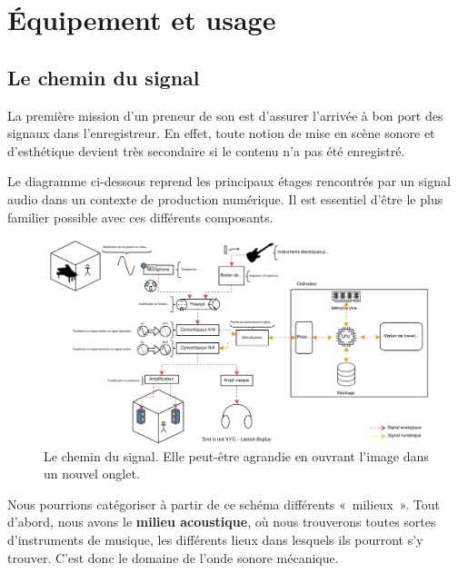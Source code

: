 \documentclass[
]{book}
\begin{document}
\hypertarget{part-uxe9quipement-et-usage}{%
\part{Équipement et usage}\label{part-uxe9quipement-et-usage}}

\hypertarget{le-chemin-du-signal}{%
\chapter{Le chemin du signal}\label{le-chemin-du-signal}}

La première mission d'un preneur de son est d'assurer l'arrivée à bon port des signaux dans l'enregistreur. En effet, toute notion de mise en scène sonore et d'esthétique devient très secondaire si le contenu n'a pas été enregistré.

Le diagramme ci-dessous reprend les principaux étages rencontrés par un signal audio dans un contexte de production numérique. Il est essentiel d'être le plus familier possible avec ces différents composants.

\begin{figure}

{\centering \includegraphics[width=1\linewidth]{_resources/diagrams/cheminSignal} 

}

\caption{Le chemin du signal. Elle peut-être agrandie en ouvrant l'image dans un nouvel onglet.}\label{fig:unnamed-chunk-15}
\end{figure}

Nous pourrions catégoriser à partir de ce schéma différents «~milieux~». Tout d'abord, nous avons le \textbf{milieu acoustique}, où nous trouverons toutes sortes d'instruments de musique, les différents lieux dans lesquels ils pourront s'y trouver. C'est donc le domaine de l'onde sonore mécanique.
\end{document}
